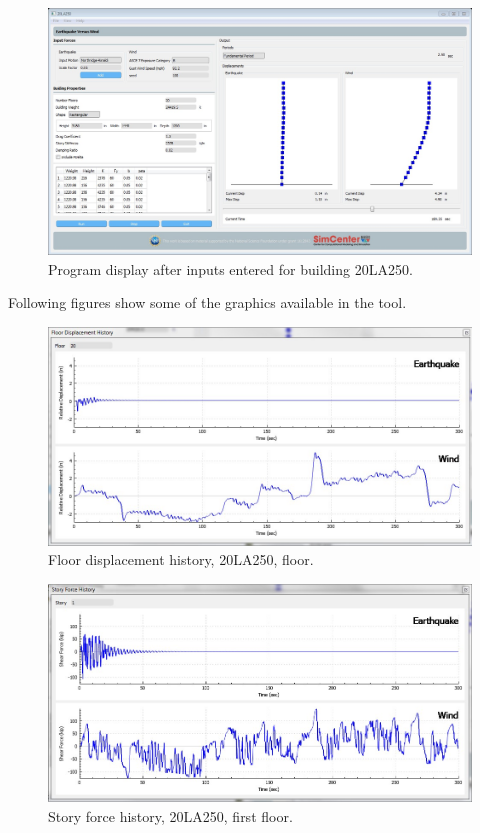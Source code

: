 \documentclass[onecolumn, fleqn]{article}
\begin{document}
\begin{figure}[H]
	\centering \includegraphics[width=0.9\linewidth]{20LA250_1.JPG}
	\caption{Program display after inputs entered for building 20LA250.}
\end{figure}
Following figures show some of the graphics available in the tool.
\begin{figure}[H]
	\centering \includegraphics[scale=0.35]{20LA250_fdh.JPG}
	\caption{Floor displacement history, 20LA250,  floor.}
\end{figure}
\begin{figure}[H]
	\centering \includegraphics[scale=0.35]{20LA250_sfh.JPG}
	\caption{Story force history, 20LA250, first floor.}
\end{figure}
\end{document}
